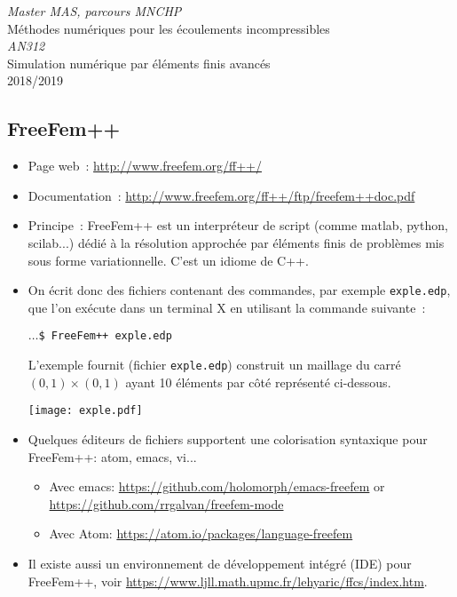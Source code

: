 \documentclass[a4paper,11pt]{article}
\begin{document}
\begin{center}
  \parbox{0.8\linewidth}{
    \begin{center}\large
      \emph{Master MAS, parcours MNCHP}\\ Méthodes numériques pour les
      écoulements incompressibles \\[2ex]
      \emph{AN312}\\ Simulation numérique par éléments finis avancés \\
      [2ex] 2018/2019
    \end{center}%
  }
\end{center}

\subsection*{FreeFem++}

\begin{itemize}
\item Page web~: \url{http://www.freefem.org/ff++/}
\item Documentation~:
  \url{http://www.freefem.org/ff++/ftp/freefem++doc.pdf}
\item Principe~: FreeFem++ est un interpréteur de script (comme matlab,
  python, scilab...) dédié à la résolution approchée par éléments finis
  de problèmes mis sous forme variationnelle. C'est un idiome de C++.
\item On écrit donc des fichiers contenant des commandes, par exemple
  {\tt exple.edp}, que l'on exécute dans un terminal X en utilisant la
  commande suivante~:
  \begin{flushleft}
    \tt $\ldots$\$ FreeFem++ exple.edp 
  \end{flushleft}
  L'exemple fournit (fichier {\tt exple.edp}) construit un maillage du
  carré $(0,1)\times(0,1)$ ayant 10 éléments par côté représenté
  ci-dessous.
  \begin{center}
    \texttt{[image: exple.pdf]}
  \end{center}
\item Quelques éditeurs de fichiers supportent une colorisation
  syntaxique pour FreeFem++: atom, emacs, vi...
  \begin{itemize}
  \item Avec emacs: \url{https://github.com/holomorph/emacs-freefem} or
    \url{https://github.com/rrgalvan/freefem-mode}
  \item Avec Atom: \url{https://atom.io/packages/language-freefem}
  \end{itemize}
\item Il existe aussi un environnement de développement intégré (IDE)
  pour FreeFem++, voir
  \url{https://www.ljll.math.upmc.fr/lehyaric/ffcs/index.htm}. 
\end{itemize}
\end{document}
